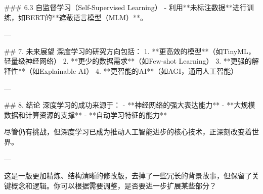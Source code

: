 ### 6.3 自监督学习（Self-Supervised Learning）
- 利用**未标注数据**进行训练，如BERT的**遮蔽语言模型（MLM）**。

---

## 7. 未来展望
深度学习的研究方向包括：
1. **更高效的模型**（如TinyML，轻量级神经网络）
2. **更少的数据需求**（如Few-shot Learning）
3. **更强的解释性**（如Explainable AI）
4. **更智能的AI**（如AGI，通用人工智能）

---

## 8. 结论
深度学习的成功来源于：
- **神经网络的强大表达能力**
- **大规模数据和计算资源的支撑**
- **自动学习特征的能力**

尽管仍有挑战，但深度学习已成为推动人工智能进步的核心技术，正深刻改变着世界。

---

这是一版更加精炼、结构清晰的修改版，去掉了一些冗长的背景故事，但保留了关键概念和逻辑。你可以根据需要调整，是否要进一步扩展某些部分？